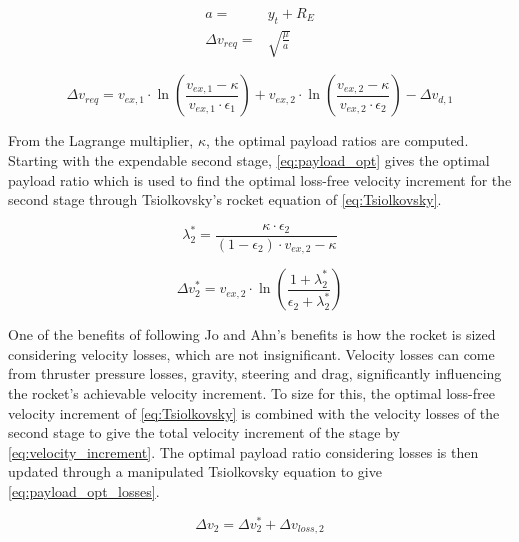 \begin{equation}
\begin{aligned}
    a =& y_t + R_E \\
    \Delta v_{req} =& \sqrt{\frac{\mu}{a}}
\end{aligned}
\label{eq:v_req}
\end{equation}

\begin{equation}
    \Delta v_{req} = v_{ex,1} \cdot \ln(\frac{v_{ex,1} - \kappa}{v_{ex,1} \cdot \epsilon_1}) + v_{ex,2} \cdot \ln(\frac{v_{ex,2} - \kappa}{v_{ex,2} \cdot \epsilon_2}) - \Delta v_{d,1}
\label{eq:Lagrangian_Tsiolkovsky}
\end{equation}

From the Lagrange multiplier, $\kappa$, the optimal payload ratios are computed. Starting with the expendable second stage, \autoref{eq:payload_opt} gives the optimal payload ratio which is used to find the optimal loss-free velocity increment for the second stage through Tsiolkovsky's rocket equation of \autoref{eq:Tsiolkovsky}.

\begin{equation}
    \lambda_2^* = \frac{\kappa \cdot \epsilon_2}{(1 - \epsilon_2) \cdot v_{ex,2} - \kappa}
\label{eq:payload_opt}
\end{equation}

\begin{equation}
    \Delta v_2^* = v_{ex,2} \cdot \ln(\frac{1 + \lambda_2^*}{\epsilon_2 + \lambda_2^*})
\label{eq:Tsiolkovsky}
\end{equation}

One of the benefits of following Jo and Ahn's benefits is how the rocket is sized considering velocity losses, which are not insignificant. Velocity losses can come from thruster pressure losses, gravity, steering and drag, significantly influencing the rocket's achievable velocity increment. To size for this, the optimal loss-free velocity increment of \autoref{eq:Tsiolkovsky} is combined with the velocity losses of the second stage to give the total velocity increment of the stage by \autoref{eq:velocity_increment}. The optimal payload ratio considering losses is then updated through a manipulated Tsiolkovsky equation to give \autoref{eq:payload_opt_losses}.

\begin{equation}
    \Delta v_2 = \Delta v_2^* + \Delta v_{loss,2}
\label{eq:velocity_increment}
\end{equation}

